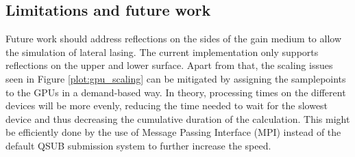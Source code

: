 \subsection{Limitations and future work}
\label{subsec:limitations}
Future work should address reflections on the sides of the gain medium to allow the
simulation of lateral lasing. The current implementation only supports
reflections on the upper and lower surface.
Apart from that, the scaling issues seen in Figure \ref{plot:gpu_scaling} can be
mitigated by assigning the samplepoints to the GPUs in a demand-based way. In
theory, processing times on the different devices will be more evenly, reducing
the time needed to wait for the slowest device and thus decreasing the
cumulative duration of the calculation. This might be efficiently done by
the use of Message Passing Interface (MPI)\cite{MPI} instead of the default QSUB
submission system to further increase the speed.
